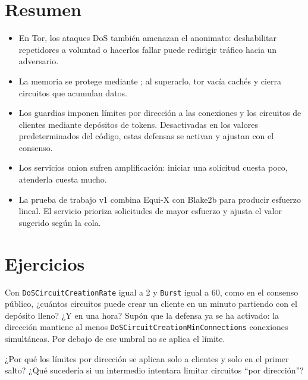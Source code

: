 \section*{Resumen}
\begin{itemize}
  \item En Tor, los ataques DoS también amenazan el anonimato: deshabilitar repetidores a voluntad o hacerlos fallar puede redirigir tráfico hacia un adversario.
  \item La memoria se protege mediante ; al superarlo, tor vacía cachés y cierra circuitos que acumulan datos.
  \item Los guardias imponen límites por dirección a las conexiones y los circuitos de clientes mediante depósitos de tokens. Desactivadas en los valores predeterminados del código, estas defensas se activan y ajustan con el consenso.
  \item Los servicios onion sufren amplificación: iniciar una solicitud cuesta poco, atenderla cuesta mucho.
  \item La prueba de trabajo v1 combina Equi-X con Blake2b para producir esfuerzo lineal. El servicio prioriza solicitudes de mayor esfuerzo y ajusta el valor sugerido según la cola.
\end{itemize}

\section*{Ejercicios}

\begin{esercizio}[1]\label{es:15-bucket}
Con \texttt{DoSCircuitCreationRate} igual a 2 y \texttt{Burst} igual a 60, como en el consenso público, ¿cuántos circuitos puede crear un cliente en un minuto partiendo con el depósito lleno? ¿Y en una hora? Supón que la defensa ya se ha activado: la dirección mantiene al menos \texttt{DoSCircuitCreationMinConnections} conexiones simultáneas. Por debajo de ese umbral no se aplica el límite.
\end{esercizio}

\begin{esercizio}[1]\label{es:15-guard}
¿Por qué los límites por dirección se aplican solo a clientes y solo en el primer salto? ¿Qué sucedería si un intermedio intentara limitar circuitos \enquote{por dirección}?
\end{esercizio}

